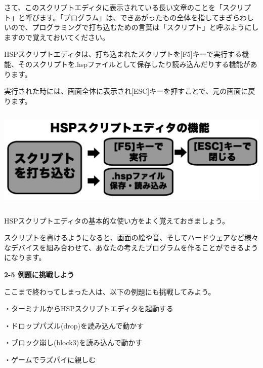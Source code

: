 \documentclass[a4paper,dvipdfmx]{jarticle}
\begin{document}
さて、このスクリプトエディタに表示されている長い文章のことを「スクリプト」と呼びます。「プログラム」は、できあがったもの全体を指してまぎらわしいので、プログラミングで打ち込むための言葉は「スクリプト」と呼ぶようにしますので覚えておいてください。


\bigskip


\bigskip


\bigskip

HSPスクリプトエディタは、打ち込まれたスクリプトを[F5]キーで実行する機能、そのスクリプトを.hspファイルとして保存したり読み込んだりする機能があります。

実行された時には、画面全体に表示され[ESC]キーを押すことで、元の画面に戻ります。



\begin{center}
\includegraphics[width=15.533cm,height=4.86cm]{text02-img/text02-img013.png}

\end{center}

\bigskip

HSPスクリプトエディタの基本的な使い方をよく覚えておきましょう。

スクリプトを書けるようになると、画面の絵や音、そしてハードウェアなど様々なデバイスを組み合わせて、あなたの考えたプログラムを作ることができるようになります。


\bigskip


\bigskip

{\bfseries
2-5 例題に挑戦しよう}


\bigskip

ここまで終わってしまった人は、以下の例題にも挑戦してみよう。


\bigskip

・ターミナルからHSPスクリプトエディタを起動する

・ドロップパズル(drop)を読み込んで動かす

・ブロック崩し(block3)を読み込んで動かす

・ゲームでラズパイに親しむ
\end{document}
